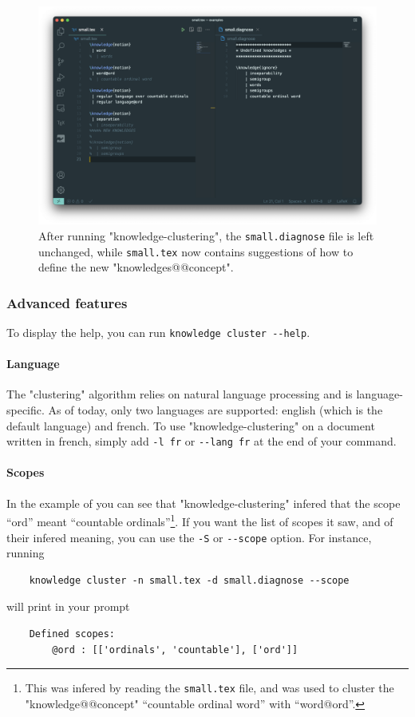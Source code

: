 \documentclass{article}
\begin{document}
\begin{figure}[htb]
    \centering
    \includegraphics[width=.9\textwidth]{img/small-after.png}
    \caption{%
        \label{fig:clustering-after}
        After running "knowledge-clustering", the \texttt{small.diagnose} file
        is left unchanged, while \texttt{small.tex} now contains suggestions
        of how to define the new "knowledges@@concept".
     }
\end{figure}


\subsubsection{Advanced features}

To display the help, you can run \verb|knowledge cluster --help|.

\paragraph{Language} The "clustering" algorithm relies on natural language 
processing and is language-specific. As of today, only two languages
are supported: english (which is the default language) and french.
To use "knowledge-clustering" on a document written in french,
simply add \verb|-l fr| or \verb|--lang fr| at the end of your command.


\paragraph{Scopes} In the example of
you can see that "knowledge-cluste\-ring" infered that the
scope ``ord'' meant ``countable ordinals''\footnote{This was infered
by reading the \texttt{small.tex} file, and was used to cluster
the "knowledge@@concept" ``countable ordinal word'' with ``word@ord''.}.
If you want the list of scopes it saw,
and of their infered meaning, you can use the \verb|-S| or \verb|--scope| 
option. 
For instance, running
\begin{verbatim}
    knowledge cluster -n small.tex -d small.diagnose --scope
\end{verbatim}
will print in your prompt
\begin{verbatim}
    Defined scopes:
	    @ord : [['ordinals', 'countable'], ['ord']]
\end{verbatim}
\end{document}

